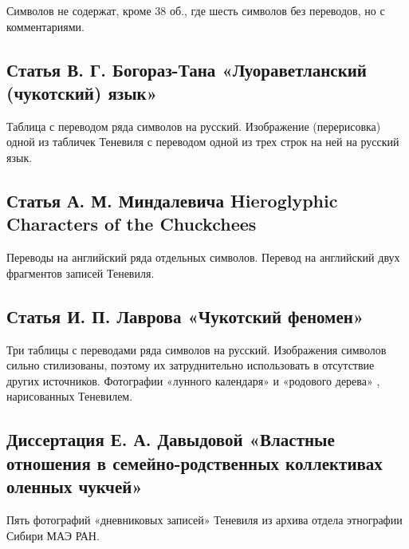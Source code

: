 \documentclass{article}
\newcounter{glyph}
\begin{document}
Символов не содержат, кроме 38 об., где шесть символов без переводов, но с комментариями.

\subsection{Статья В. Г. Богораз-Тана «Луораветланский (чукотский) язык»}

Таблица с переводом ряда символов на русский. Изображение (перерисовка) одной из табличек Теневиля с переводом одной из трех строк на ней на русский язык.

\subsection{Статья А. М. Миндалевича Hieroglyphic Characters of the Chuckchees}

Переводы на английский ряда отдельных символов. Перевод на английский двух фрагментов записей Теневиля.

\subsection{Статья И. П. Лаврова «Чукотский феномен»}

Три таблицы с переводами ряда символов на русский. Изображения символов сильно стилизованы, поэтому их затруднительно использовать в отсутствие других источников. Фотографии «лунного календаря» и «родового дерева» , нарисованных Теневилем.

\subsection{Диссертация Е. А. Давыдовой «Властные отношения в семейно-родственных коллективах оленных чукчей»}

Пять фотографий «дневниковых записей» Теневиля из архива отдела этнографии Сибири МАЭ РАН.

\printbibliography
\end{document}
